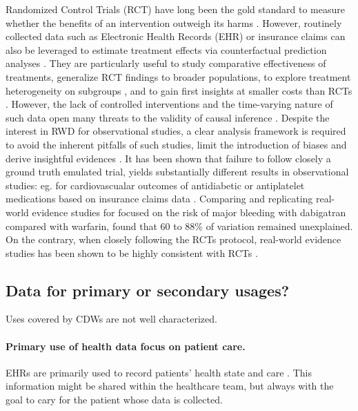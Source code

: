 %
Randomized Control Trials (RCT) have
long been the gold standard to measure whether the benefits of an intervention
outweigh its harms \citep{brook1986method}. However, routinely collected data
such as Electronic Health Records (EHR) or insurance claims
\citep{wang2023early} can also be leveraged to estimate treatment effects via
counterfactual prediction analyses \citep{hernan2019second}.  They are
particularly useful to study comparative effectiveness of treatments,
generalize RCT findings to broader populations, to explore treatment
heterogeneity on subgroups \citep{mant1999can,desai2021broadening}, and to
gain first insights at smaller costs than RCTs
\citep{black1996we,bosdriesz2020evidence}. However, the lack of controlled
interventions and the time-varying nature of such data open many threats to
the validity of causal inference \citep{bouvier2023should}.
Despite the interest in RWD for observational studies, a clear analysis
framework is required to avoid the inherent pitfalls of such studies, limit the
introduction of biases and derive insightful evidences \citep{hernan2019second,
    wang2023emulation}. It has been shown that failure to follow closely a ground
truth emulated trial,
yields substantially different results in observational studies: eg. for
cardiovascualar outcomes of antidiabetic or antiplatelet medications based on
insurance claims data \citep{schneeweiss2021conducting}. Comparing and
replicating real-world evidence studies for focused on the risk of major
bleeding
with dabigatran compared with warfarin, \cite{wang2022understanding} found that
60 to 88\% of variation remained unexplained. On the contrary, when closely
following the RCTs protocol, real-world evidence studies has been shown to be
highly consistent with RCTs \citep{wang2023emulation}.


% 


\subsection{Data for primary or secondary usages?}%
\label{subsec:cdw:data_usages}%

Uses covered by CDWs are not well characterized.

\paragraph{Primary use of health data focus on patient care.}
EHRs are primarily used to record patients' health state and care
\citep{safran_toward_2007,eu_primary_2022}. This information might be shared within the
healthcare team, but always with the goal to cary for the patient whose data is
collected.


